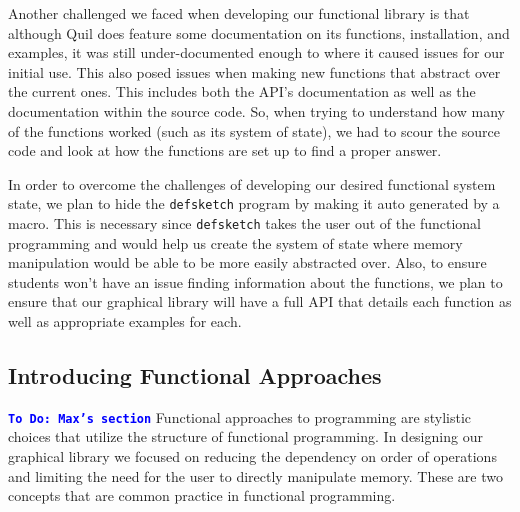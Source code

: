 \documentclass[12pt]{article}
\newcommand{\comment}[1]{{\bf \tt  {#1}}}
\newcommand{\todo}[1]{\textcolor{blue}{\comment{To Do: {#1}}}}
\begin{document}
Another challenged we faced when developing our functional library is that although Quil does feature some documentation on its functions, installation, and examples, it was still under-documented enough to where it caused issues for our initial use. This also posed issues when making new functions that abstract over the current ones. This includes both the API’s documentation as well as the documentation within the source code. So, when trying to understand how many of the functions worked (such as its system of state), we had to scour the source code and look at how the functions are set up to find a proper answer. 

In order to overcome the challenges of developing our desired functional system state, we plan to hide the \texttt{defsketch} program by making it auto generated by a macro. This is necessary since \texttt{defsketch} takes the user out of the functional programming and would help us create the system of state where memory manipulation would be able to be more easily abstracted over. Also, to ensure students won’t have an issue finding information about the functions, we plan to ensure that our graphical library will have a full API that details each function as well as appropriate examples for each. 

\subsection{Introducing Functional Approaches}\label{subsec:functional}
\todo{Max's section}
Functional approaches to programming are stylistic choices that utilize the structure of functional programming. In designing our graphical library we focused on reducing the dependency on order of operations and limiting the need for the user to directly manipulate memory. These are two concepts that are common practice in functional programming.
\end{document}

